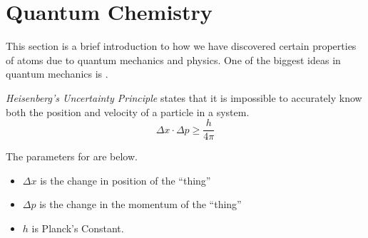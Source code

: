 \section{Quantum Chemistry} \label{sec:Quantum Chemistry}
This section is a brief introduction to how we have discovered certain properties of atoms due to quantum mechanics and physics.
One of the biggest ideas in quantum mechanics is .
\begin{definition} \label{def:Heisenbergs Uncertainty Principle}
  \emph{Heisenberg's Uncertainty Principle} states that it is impossible to accurately know both the position and velocity of a particle in a system.
  \begin{equation} \label{eq:Heisenbergs Uncertainty Principle}
    \Delta x \cdot \Delta p \geq \frac{h}{4 \pi}
  \end{equation}
  \begin{remark}
    The parameters for  are below.
    \begin{itemize}[noitemsep, nolistsep]
    \item $\Delta x$ is the change in position of the ``thing''
    \item $\Delta p$ is the change in the momentum of the ``thing''
    \item $h$ is Planck's Constant.
    \end{itemize}
  \end{remark}
\end{definition}
